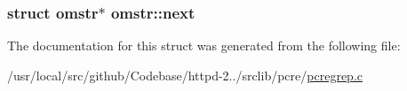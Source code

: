 \subsubsection[{\texorpdfstring{next}{next}}]{\setlength{\rightskip}{0pt plus 5cm}struct {\bf omstr}$\ast$ omstr\+::next}\hypertarget{structomstr_af0fdfa180fd622c0e3af2803cf548999}{}\label{structomstr_af0fdfa180fd622c0e3af2803cf548999}


The documentation for this struct was generated from the following file\+:\begin{DoxyCompactItemize}
\item 
/usr/local/src/github/\+Codebase/httpd-\/2../srclib/pcre/\hyperlink{pcregrep_8c}{pcregrep.\+c}\end{DoxyCompactItemize}

